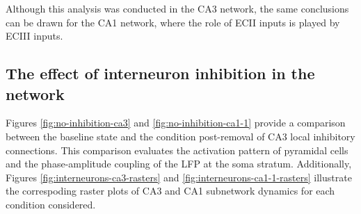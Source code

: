 \documentclass[../main.tex]{subfiles}
\begin{document}
Although this analysis was conducted in the CA3 network, the same conclusions can be drawn for the CA1 network, where the role of ECII inputs is played by ECIII inputs.

\subsection{The effect of interneuron inhibition in the network}
Figures \ref{fig:no-inhibition-ca3} and \ref{fig:no-inhibition-ca1-1} provide a comparison between the baseline state and the condition post-removal of CA3 local inhibitory connections.
This comparison evaluates the activation pattern of pyramidal cells and the phase-amplitude coupling of the LFP at the soma stratum.
Additionally, Figures \ref{fig:interneurons-ca3-rasters} and \ref{fig:interneurons-ca1-1-rasters} illustrate the correspoding raster plots of CA3 and CA1 subnetwork dynamics for each condition considered.
\end{document}
